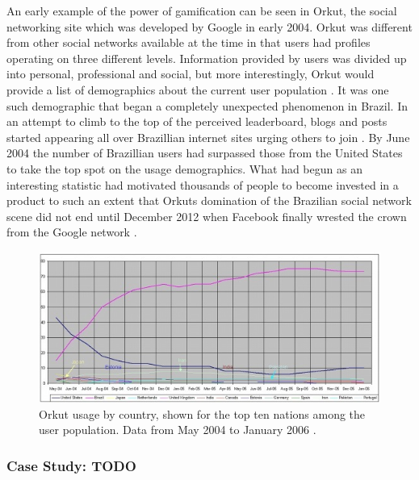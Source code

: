 \documentclass{article}
\begin{document}
An early example of the power of gamification can be seen in Orkut, the social networking site which was developed by Google in early 2004. Orkut was different from other social networks available at the time in that users had profiles operating on three different levels. Information provided by users was divided up into personal, professional and social, but more interestingly, Orkut would provide a list of demographics about the current user population \cite{fragoso2006wtf}. It was one such demographic that began a completely unexpected phenomenon in Brazil. In an attempt to climb to the top of the perceived leaderboard, blogs and posts started appearing all over Brazillian internet sites urging others to join \cite{zichermann2010game}.  By June 2004 the number of Brazillian users had surpassed those from the United States to take the top spot on the usage demographics. What had begun as an interesting statistic had motivated thousands of people to become invested in a product to such an extent that Orkuts domination of the Brazilian social network scene did not end until December 2012 when Facebook finally wrested the crown from the Google network \cite{1_comscore_2012}.

\begin{figure}
	\includegraphics{../img/orkut-brazil.jpg}
	\caption{Orkut usage by country, shown for the top ten nations among the user population. Data from May 2004 to January 2006 \cite{fragoso2006wtf}.}
	\label{orkut-brazil}
\end{figure}

\subsubsection{Case Study: TODO}
\end{document}

